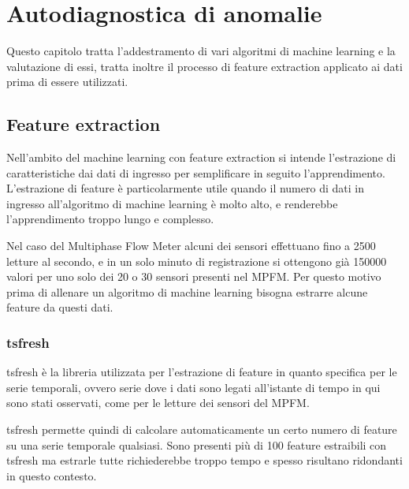 \chapter{Autodiagnostica di anomalie}
\label{AutodiagnosticaDiAnomalie}

Questo capitolo tratta l'addestramento di vari algoritmi di machine learning e la valutazione di essi, tratta inoltre il processo di feature extraction applicato ai dati prima di essere utilizzati.

\section{Feature extraction}
Nell'ambito del machine learning con feature extraction si intende l'estrazione di caratteristiche dai dati di ingresso per semplificare in seguito l'apprendimento.
L'estrazione di feature è particolarmente utile quando il numero di dati in ingresso all'algoritmo di machine learning è molto alto, e renderebbe l'apprendimento troppo lungo e complesso.

Nel caso del Multiphase Flow Meter alcuni dei sensori effettuano fino a 2500 letture al secondo, e in un solo minuto di registrazione si ottengono già 150000 valori per uno solo dei 20 o 30 sensori presenti nel MPFM.
Per questo motivo prima di allenare un algoritmo di machine learning bisogna estrarre alcune feature da questi dati.

\subsection{tsfresh}
tsfresh è la libreria utilizzata per l'estrazione di feature in quanto specifica per le serie temporali, ovvero serie dove i dati sono legati all'istante di tempo in qui sono stati osservati, come per le letture dei sensori del MPFM.

tsfresh permette quindi di calcolare automaticamente un certo numero di feature su una serie temporale qualsiasi. Sono presenti più di 100 feature estraibili con tsfresh ma estrarle tutte richiederebbe troppo tempo e spesso risultano ridondanti in questo contesto.

